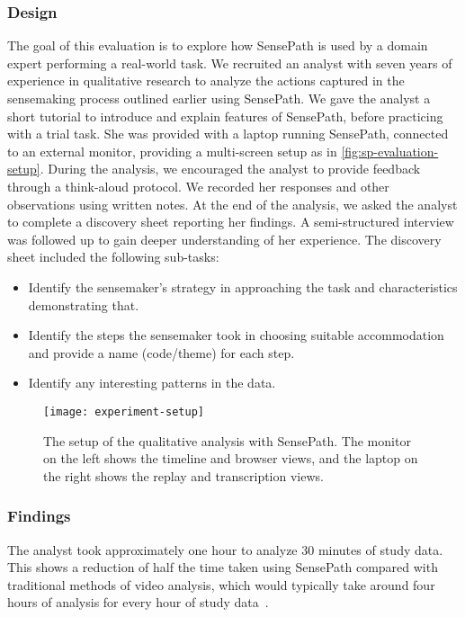 \subsubsection{Design}
The goal of this evaluation is to explore how SensePath is used by a domain expert performing a real-world task. We recruited an analyst with seven years of experience in qualitative research to analyze the actions captured in the sensemaking process outlined earlier using SensePath. We gave the analyst a short tutorial to introduce and explain features of SensePath, before practicing with a trial task. She was provided with a laptop running SensePath, connected to an external monitor, providing a multi-screen setup as in \autoref{fig:sp-evaluation-setup}. During the analysis, we encouraged the analyst to provide feedback through a think-aloud protocol. We recorded her responses and other observations using written notes. At the end of the analysis, we asked the analyst to complete a discovery sheet reporting her findings. A semi-structured interview was followed up to gain deeper understanding of her experience. The discovery sheet included the following sub-tasks:
\begin{itemize}
	\item Identify the sensemaker's strategy in approaching the task and characteristics demonstrating that.
	\item Identify the steps the sensemaker took in choosing suitable accommodation and provide a name (code/theme) for each step.
	\item Identify any interesting patterns in the data.
\end{itemize}

\begin{figure}
\centering
\texttt{[image: experiment-setup]}
\caption[The setup of the qualitative analysis with SensePath]{The setup of the qualitative analysis with SensePath. The monitor on the left shows the timeline and browser views, and the laptop on the right shows the replay and transcription views.}
\label{fig:sp-evaluation-setup}
\end{figure}

\subsubsection{Findings}
The analyst took approximately one hour to analyze 30 minutes of study data. This shows a reduction of half the time taken using SensePath compared with traditional methods of video analysis, which would typically take around four hours of analysis for every hour of study data~\cite{Burr2006}.

